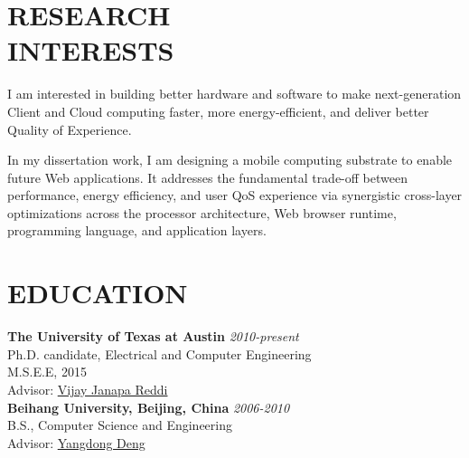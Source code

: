 \documentclass[margin, 9pt]{res} %
\begin{document}
\begin{resume}


\vspace*{-5pt}
\section{RESEARCH\\ INTERESTS} 

I am interested in building better hardware and software to make next-generation
Client and Cloud computing faster, more energy-efficient, and deliver better
Quality of Experience.

In my dissertation work, I am designing a mobile computing substrate to enable
future Web applications. It addresses the fundamental trade-off between
performance, energy efficiency, and user QoS experience via synergistic
cross-layer optimizations across the processor architecture, Web browser
runtime, programming language, and application layers.
 


\section{EDUCATION}

\textbf{The University of Texas at Austin} \hfill\textit{2010-present}\\
Ph.D. candidate, Electrical and Computer Engineering\\
M.S.E.E, 2015\\
Advisor: \href{http://3nity.io/~vj/}{Vijay Janapa Reddi}\\

\vspace*{-5pt}
\textbf{Beihang University, Beijing, China} \hfill\textit{2006-2010}\\
B.S., Computer Science and Engineering\\
Advisor: \href{https://research.nvidia.com/content/yangdong-steve-deng}{Yangdong Deng}


\end{resume}
\end{document}
